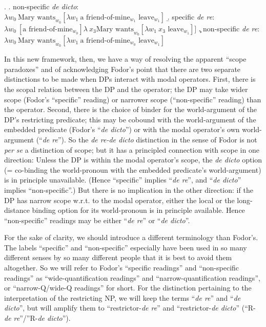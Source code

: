 \ex. \a. non-specific \emph{de dicto}:\\
$\lambda w_{0}\ \mbox{Mary wants}_{w_{0}} [ \lambda w_{1}\ \mbox{a friend-of-mine}_{w_{1}} \mbox{ leave}_{w_{1}} ]$ 
\b. specific \emph{de re}:\\
$\lambda w_{0}\ [ \mbox{a friend-of-mine}_{w_{0}} ] \lambda\ x_{3} \mbox{Mary wants}_{w_{0}} [ \lambda w_{1}\ x_{3} \mbox{ leave}_{w_{1}} ]]$ 
\c. non-specific \emph{de re}:\\
$\lambda w_{0}\ \mbox{Mary wants}_{w_{0}} [ \lambda w_{1}\ \mbox{a friend-of-mine}_{w_{0}} \mbox{ leave}_{w_{1}} ]$

In this new framework, then, we have a way of resolving the apparent ``scope paradoxes'' and of acknowledging Fodor's point that there are two separate distinctions to be made when DPs interact with modal operators. First, there is the scopal relation between the DP and the operator; the DP may take wider scope (Fodor's ``specific'' reading) or narrower scope (``non-specific'' reading) than the operator. Second, there is the choice of binder for the world-argument of the DP's restricting predicate; this may be cobound with the world-argument of the embedded predicate (Fodor's ``\emph{de dicto}'') or with the modal operator's own world-argument (``\emph{de re}''). So the \emph{de re-de dicto} distinction in the sense of Fodor is not \emph{per se} a distinction of scope; but it has a principled connection with scope in one direction: Unless the DP is within the modal operator's scope, the \emph{de dicto} option (= co-binding the world-pronoun with the embedded predicate's world-argument) is in principle unavailable. (Hence ``specific'' implies ``\emph{de re}'', and ``\emph{de dicto}'' implies ``non-specific''.) But there is no implication in the other direction: if the DP has narrow scope w.r.t. to the modal operator, either the local or the long-distance binding option for its world-pronoun is in principle available. Hence ``non-specific'' readings may be either ``\emph{de re}'' or ``\emph{de dicto}''.

For the sake of clarity, we should introduce a different terminology than Fodor's. The labels ``specific'' and ``non-specific'' especially have been used in so many different senses by so many different people that it is best to avoid them altogether. So we will refer to Fodor's ``specific readings'' and ``non-specific readings'' as ``wide-quantification readings'' and ``narrow-quantification readings'', or ``narrow-Q/wide-Q readings'' for short. For the distinction pertaining to the interpretation of the restricting NP, we will keep the terms ``\emph{de re}'' and ``\emph{de dicto}'', but will amplify them to ``restrictor-\emph{de re}'' and ``restrictor-\emph{de dicto}'' (``R-\emph{de re}''/''R-\emph{de dicto}'').

